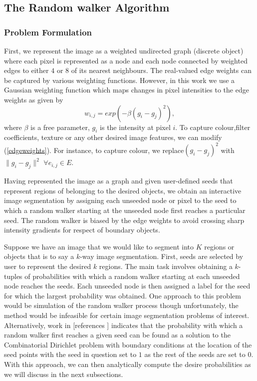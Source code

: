 \documentclass[10pt,a4paper]{article}
\begin{document}
\subsection{The Random walker Algorithm}
\subsubsection{Problem Formulation}
First, we represent the image as a weighted undirected graph (discrete object) where each pixel is represented as a node and each node connected by weighted edges to either $4$ or $8$ of its nearest neighbours. The real-valued edge weights can be captured by various weighting functions. However, in this work we use a Gaussian weighting function which maps changes in pixel intensities to  the edge weights as given by
\begin{equation}
w_{i,j} = exp(-\beta (g_i -g_j)^2),
\label{edgeweights}
\end{equation}
where $\beta$ is a free parameter, $g_i$ is the intensity at pixel $i$.
To capture colour,filter coefficients, texture or any other desired image features, we can modify (\ref{edgeweights}). For instance, to capture colour, we replace$(g_i -g_j)^2$ with $\|g_i -g_j\|^2$  $ \forall e_{i,j} \in E$.

Having represented the image as a graph and given user-defined seeds that represent regions of belonging to the desired objects, we obtain an interactive image segmentation by assigning each unseeded node or pixel to the seed to which a random walker starting at the unseeded node first reaches a particular seed. The random walker is biased by the edge weights to avoid crossing sharp intensity gradients for respect of boundary objects.

Suppose we have an image that we would like to segment into $K$ regions or objects that is to say a $k$-way image segmentation.
First, seeds are selected by user to represent the desired $k$ regions. The main task involves obtaining a $k$-tuples of probabilities with which a random walker starting at each unseeded node reaches the seeds. Each unseeded node is then assigned a label for the seed for which the largest probability was obtained. One approach to this problem would be simulation of the random walker process though unfortunately, the method would be infeasible for certain image segmentation problems of interest. Alternatively, work in [references ] indicates that the probability with which a random walker first reaches a given seed can be found as a solution to the Combinatorial Dirichlet problem  with boundary conditions at the location of the seed points with the seed in question set to $1$ as the rest of the seeds are set to $0$. With this approach, we can then analytically compute the desire probabilities as we will discuss in the next subsections. 
\end{document}
